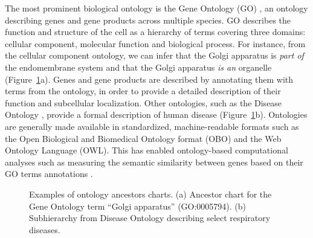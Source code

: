 The most prominent biological ontology is the Gene Ontology (GO) \cite{GeneOntology2018}, an ontology describing genes and gene products across multiple species. GO describes the function and structure of the cell as a hierarchy of terms covering three domains: cellular component, molecular function and biological process. For instance, from the cellular component ontology, we can infer that the Golgi apparatus is \emph{part of} the endomembrane system and that the Golgi apparatus \emph{is an} organelle (Figure~\ref{fig:ontologies}a). Genes and gene products are described by annotating them with terms from the ontology, in order to provide a detailed description of their function and subcellular localization.
Other ontologies, such as the Disease Ontology \cite{Kibbe2014}, provide a formal description of human disease (Figure~\ref{fig:ontologies}b). Ontologies are generally made available in standardized, machine-readable formats such as the Open Biological and Biomedical Ontology format (OBO) and the Web Ontology Language (OWL). This has enabled ontology-based computational analyses such as measuring the semantic similarity between genes based on their GO terms annotations \cite{Mazandu2016}.
%
\begin{figure}
    \centering
    \hfill
    \caption{Examples of ontology ancestors charts. (a) Ancestor chart for the Gene Ontology term \enquote{Golgi apparatus} (GO:0005794). (b) Subhierarchy from Disease Ontology describing select respiratory diseases.}
    \label{fig:ontologies}
\end{figure}

